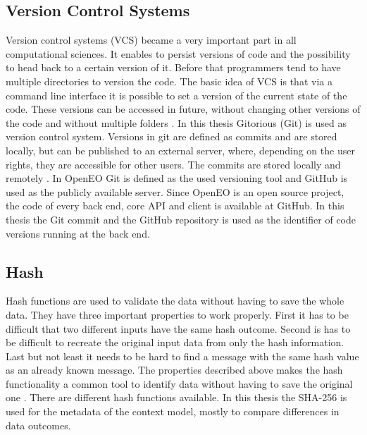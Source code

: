 \documentclass[draft,final]{vutinfth} %
\begin{document}
\subsection{Version Control Systems}\label{Version Control Systems}
Version control systems (VCS) became a very important part in all computational sciences. It enables to persist versions of code and the possibility to head back to a certain version of it. Before that programmers tend to have multiple directories to version the code. The basic idea of VCS is that via a command line interface it is possible to set a version of the current state of the code. These versions can be accessed in future, without changing other versions of the code and without multiple folders \cite{10.1109/MCSE.2009.194}. 
In this thesis Gitorious (Git) is used as version control system. Versions in git are defined as commits and are stored locally, but can be published to an external server, where, depending on the user rights, they are accessible for other users. The commits are stored locally and remotely \cite{QuickGit}. In OpenEO Git is defined as the used versioning tool and GitHub is used as the publicly available server. Since OpenEO is an open source project, the code of every back end, core API and client is available at GitHub. In this thesis the Git commit and the GitHub repository is used as the identifier of code versions running at the back end. 

\subsection{Hash}\label{Hash}
Hash functions are used to validate the data without having to save the whole data. They have three important properties to work properly. First it has to be difficult that two different inputs have the same hash outcome. Second is has to be difficult to recreate the original input data from only the hash information. Last but not least it needs to be hard to find a message with the same hash value as an already known message. The properties described above makes the hash functionality a common tool to identify data without having to save the original one \cite{3b412889270f46f59740fbf1ca8cd7e0}.  
There are different hash functions available. In this thesis the SHA-256 is used for the metadata of the context model, mostly to compare differences in data outcomes.

\end{document}
